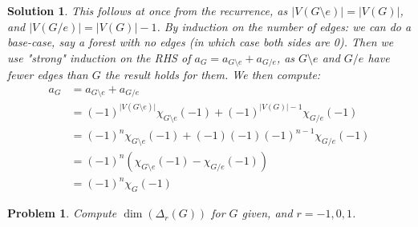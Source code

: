 \documentclass{article}
\theoremstyle{normal}
\newtheorem{problem}{Problem}
\theoremstyle{thmit}
\newtheorem*{solution}{Solution}
\begin{document}
    \begin{solution}
        This follows at once from the recurrence, as $\vert V(G\setminus{e})\vert = \vert V(G)\vert$, and
        $\vert V(G/e)\vert = \vert V(G)\vert-1$. By induction on the number of edges: we can do a
        base-case, say a forest with no edges (in which case both sides are 0). Then we use "strong"
        induction on the RHS of $a_G = a_{G\setminus{e}} + a_{G/e}$, as $G\setminus{e}$ and $G/e$ have
        fewer edges than $G$ the result holds for them. We then compute:
        \begin{subequations}
            \begin{align}
                a_G&=a_{G\setminus{e}}+a_{G/e}\\
                    &=(-1)^{\vert V(G\setminus{e})\vert}
                        \chi_{G\setminus{e}}(-1)+(-1)^{\vert V(G)\vert -1}\chi_{G/e}(-1)\\
                    &=(-1)^{n}\chi_{G\setminus{e}}(-1) +(-1) (-1) (-1)^{n-1} \chi_{G/e}(-1)\\
                    &=(-1)^{n}\left(\chi_{G\setminus{e}}(-1) - \chi_{G/e}(-1) \right)\\
                    &=(-1)^{n}\chi_{G}(-1)
            \end{align}
        \end{subequations}
    \end{solution}
    \begin{problem}
        Compute $\operatorname{dim}(\Delta_r(G))$ for $G$ given, and $r=-1,0,1$.
    \end{problem}
\end{document}
